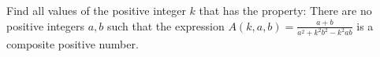 Find all values of the positive integer $k$ that has the property:
There are no positive integers $a,b$ such that the expression $A(k,a,b)=\frac{a+b}{a^2+k^2b^2-k^2ab}$ is a composite positive number.